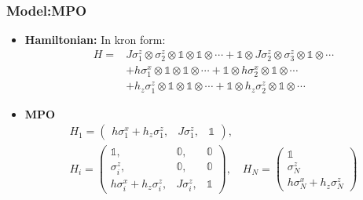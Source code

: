 \documentclass{beamer}
\begin{document}
\begin{frame}
	\frametitle{Model:MPO}
	\begin{itemize}
		\item \textbf{Hamiltonian:} In kron form:
		\begin{equation}
			\begin{aligned}
				H = & J\sigma_1^z\otimes\sigma_2^z\otimes \mathbb{1}\otimes\mathbb{1}\otimes\cdots + \mathbb{1}\otimes J\sigma_2^z\otimes\sigma_3^z\otimes \mathbb{1}\otimes\cdots\\
				&+h\sigma_1^x\otimes\mathbb{1}\otimes\mathbb{1}\otimes\cdots + \mathbb{1}\otimes h\sigma_2^x\otimes\mathbb{1}\otimes\cdots \\
				& + h_z\sigma_1^z\otimes\mathbb{1}\otimes\mathbb{1}\otimes\cdots + \mathbb{1}\otimes h_z\sigma_2^z\otimes\mathbb{1}\otimes\cdots
			\end{aligned}
		\end{equation}
		\item \textbf{MPO} 
		\begin{equation}
			\begin{gathered}
				H_1 = \begin{pmatrix}
					h\sigma_1^x + h_z \sigma_1^z,& J\sigma_1^z,&\mathbb{1}
				\end{pmatrix},\\
				H_i = \begin{pmatrix}
					\mathbb{1},&\mathbb{0},&\mathbb{0}\\
					\sigma_i^z,&\mathbb{0},&\mathbb{0}\\
					h\sigma_i^x + h_z \sigma_i^z,& J\sigma_i^z,&\mathbb{1}
				\end{pmatrix},\quad 
				H_N = \begin{pmatrix}
					\mathbb{1}\\ \sigma_N^z\\h\sigma_N^x + h_z \sigma_N^z
				\end{pmatrix}
			\end{gathered}
		\end{equation}
	\end{itemize}
\end{frame}
\end{document}
